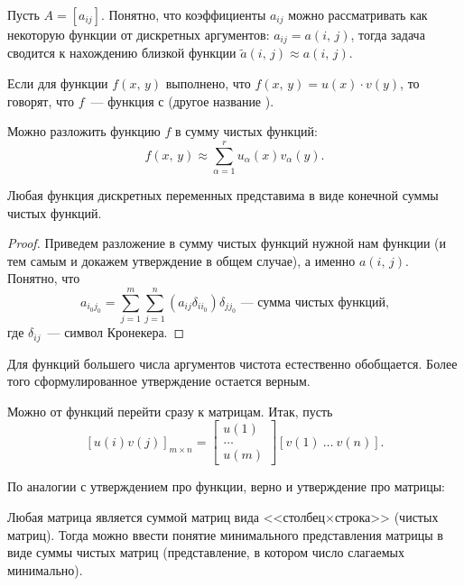 Пусть $A=[a_{ij}]$. Понятно, что коэффициенты $a_{ij}$ можно рассматривать как некоторую функции от дискретных аргументов:
$a_{ij}=a(i,\,j)$, тогда задача сводится к нахождению близкой функции $\widetilde{a}(i,\, j)\approx a(i,\, j)$.

\begin{definition}
    Если для функции $f(x,\, y)$ выполнено, что $f(x,\, y)=u(x)\cdot v(y)$, то говорят, что $f$~--- функция с 
    (другое название ).
\end{definition}

Можно разложить функцию $f$ в сумму чистых функций:
\[
    f(x,\,y)\approx \sum_{\alpha=1}^{r} u_{\alpha}(x)v_{\alpha}(y).
\]

\begin{claim}
    Любая функция дискретных переменных представима в виде конечной суммы чистых функций.

    \begin{proof}
        Приведем разложение в сумму чистых функций нужной нам функции (и тем самым и докажем утверждение в общем случае), а именно
        $a(i,\, j)$. Понятно, что
        \[
            a_{i_0j_0}=\sum_{j=1}^{m}\sum_{j=1}^n(a_{ij}\delta_{ii_0})\delta_{jj_0}\text{~--- сумма чистых функций,}
        \]
        где $\delta_{ij}$~--- символ Кронекера.

    \end{proof}
\end{claim}

\begin{remark}
    Для функций большего числа аргументов чистота естественно обобщается. Более того сформулированное утверждение остается верным.
\end{remark}

Можно от функций перейти сразу к матрицам. Итак, пусть
\[
    [u(i)v(j)]_{m\times n} = \left[
        \begin{array}{c}
            u(1)   \\
            \ldots \\
            u(m)
        \end{array}
        \right] \left[v(1)\ \ldots\ v(n)\right].
\]

По аналогии с утверждением про функции, верно и утверждение про матрицы:

\begin{claim}
    Любая матрица является суммой матриц вида <<столбец$\times$строка>> (чистых матриц). Тогда можно ввести понятие минимального представления
    матрицы в виде суммы чистых матриц (представление, в котором число слагаемых минимально).
\end{claim}

